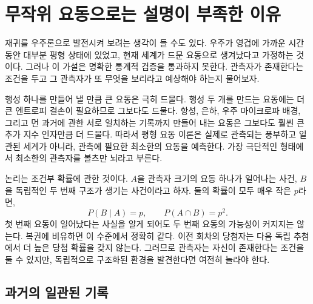 \section{무작위 요동으로는 설명이 부족한 이유}

재귀를 우주론으로 발전시켜 보려는 생각이 들 수도 있다. 우주가 영겁에 가까운 시간 동안 대부분 평형 상태에 있었고, 현재 세계가 드문 요동으로 생겨났다고 가정하는 것이다. 그러나 이 가설은 명확한 통계적 검증을 통과하지 못한다. 관측자가 존재한다는 조건을 두고 그 관측자가 또 무엇을 보리라고 예상해야 하는지 물어보자.

행성 하나를 만들어 낼 만큼 큰 요동은 극히 드물다. 행성 두 개를 만드는 요동에는 더 큰 엔트로피 결손이 필요하므로 그보다도 드물다. 항성, 은하, 우주 마이크로파 배경, 그리고 먼 과거에 관한 서로 일치하는 기록까지 만들어 내는 요동은 그보다도 훨씬 큰 추가 지수 인자만큼 더 드물다. 따라서 평형 요동 이론은 실제로 관측되는 풍부하고 일관된 세계가 아니라, 관측에 필요한 최소한의 요동을 예측한다. 가장 극단적인 형태에서 최소한의 관측자를 볼츠만 뇌라고 부른다.

논리는 조건부 확률에 관한 것이다. \(A\)을 관측자 크기의 요동 하나가 일어나는 사건, \(B\)을 독립적인 두 번째 구조가 생기는 사건이라고 하자. 둘의 확률이 모두 매우 작은 \(p\)라면,
\begin{equation}
 P(B\mid A)=p,
 \qquad
 P(A\cap B)=p^2.
 \label{eq:sm8-conditional-fluctuations}
\end{equation}
첫 번째 요동이 일어났다는 사실을 알게 되어도 두 번째 요동의 가능성이 커지지는 않는다. 복권에 비유하면 이 수준에서 정확히 같다. 이전 회차의 당첨자는 다음 독립 추첨에서 더 높은 당첨 확률을 갖지 않는다. 그러므로 관측자는 자신이 존재한다는 조건을 둘 수 있지만, 독립적으로 구조화된 환경을 발견한다면 여전히 놀라야 한다.

\begin{classroomqa}
\end{classroomqa}

\subsection{과거의 일관된 기록}

